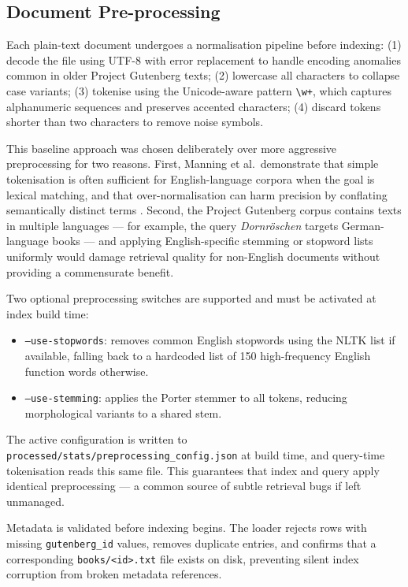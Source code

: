 \documentclass[sigconf]{acmart}
\begin{document}
\subsection{Document Pre-processing}

Each plain-text document undergoes a normalisation pipeline before indexing: (1) decode the file using UTF-8 with error replacement to handle encoding anomalies common in older Project Gutenberg texts; (2) lowercase all characters to collapse case variants; (3) tokenise using the Unicode-aware pattern \texttt{\textbackslash w+}, which captures alphanumeric sequences and preserves accented characters; (4) discard tokens shorter than two characters to remove noise symbols.

This baseline approach was chosen deliberately over more aggressive preprocessing for two reasons. First, Manning et al.\ demonstrate that simple tokenisation is often sufficient for English-language corpora when the goal is lexical matching, and that over-normalisation can harm precision by conflating semantically distinct terms \cite{manning2008}. Second, the Project Gutenberg corpus contains texts in multiple languages --- for example, the query \emph{Dornr\"{o}schen} targets German-language books --- and applying English-specific stemming or stopword lists uniformly would damage retrieval quality for non-English documents without providing a commensurate benefit.

Two optional preprocessing switches are supported and must be activated at index build time:
\begin{itemize}
    \item \texttt{--use-stopwords}: removes common English stopwords using the NLTK list if available, falling back to a hardcoded list of 150 high-frequency English function words otherwise.
    \item \texttt{--use-stemming}: applies the Porter stemmer \cite{manning2008} to all tokens, reducing morphological variants to a shared stem.
\end{itemize}

The active configuration is written to \texttt{processed/stats/preprocessing\_config.json} at build time, and query-time tokenisation reads this same file. This guarantees that index and query apply identical preprocessing --- a common source of subtle retrieval bugs if left unmanaged.

Metadata is validated before indexing begins. The loader rejects rows with missing \texttt{gutenberg\_id} values, removes duplicate entries, and confirms that a corresponding \texttt{books/<id>.txt} file exists on disk, preventing silent index corruption from broken metadata references.
\end{document}
